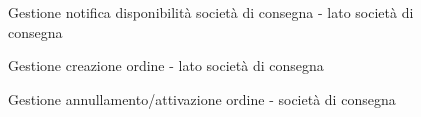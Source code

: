\documentclass[11pt]{article} %
\begin{document}
\begin{figure}[H]
\begin{center}
\caption{Gestione notifica disponibilità società di consegna - lato società di consegna}
\end{center}
\end{figure}

\begin{figure}[H]
\begin{center}
\caption{Gestione creazione ordine - lato società di consegna}
\end{center}
\end{figure}

\clearpage

\begin{figure}[p]
\begin{center}
\caption{Gestione annullamento/attivazione ordine - società di consegna}
\end{center}
\end{figure}
\end{document}
